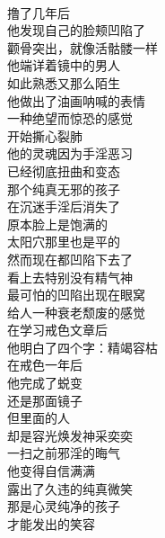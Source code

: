 \begin{poem}[凹陷的撸者]
    \begin{multicols}{2}
        \begin{center}~\\
            撸了几年后 \\ 他发现自己的脸颊凹陷了 \\ 颧骨突出，就像活骷髅一样 \\ 他端详着镜中的男人 \\ 如此熟悉又那么陌生 \\ 他做出了油画呐喊的表情 \\ 一种绝望而惊恐的感觉 \\ 开始撕心裂肺 \\ 他的灵魂因为手淫恶习 \\ 已经彻底扭曲和变态 \\ 那个纯真无邪的孩子 \\ 在沉迷手淫后消失了 \\ 原本脸上是饱满的 \\ 太阳穴那里也是平的 \\ 然而现在都凹陷下去了 \\ 看上去特别没有精气神 \\ 最可怕的凹陷出现在眼窝 \\ 给人一种衰老颓废的感觉 \\ 在学习戒色文章后 \\ 他明白了四个字：精竭容枯 \\ 在戒色一年后 \\ 他完成了蜕变 \\ 还是那面镜子 \\ 但里面的人 \\ 却是容光焕发神采奕奕 \\ 一扫之前邪淫的晦气 \\ 他变得自信满满 \\ 露出了久违的纯真微笑 \\ 那是心灵纯净的孩子 \\ 才能发出的笑容
        \end{center}
    \end{multicols}
\end{poem}

